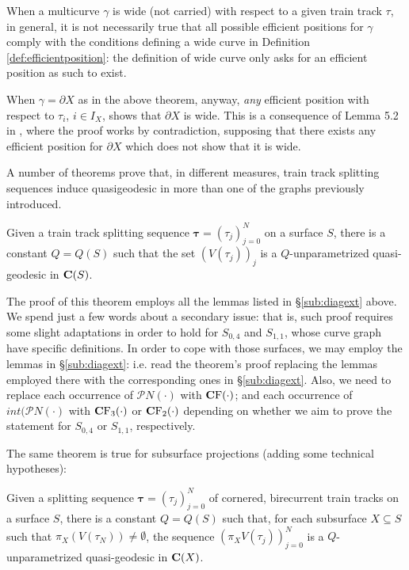 \begin{rmk}
When a multicurve $\gamma$ is wide (not carried) with respect to a given train track $\tau$, in general, it is not necessarily true that all possible efficient positions for $\gamma$ comply with the conditions defining a wide curve in Definition \ref{def:efficientposition}: the definition of wide curve only asks for an efficient position as such to exist.

When $\gamma=\partial X$ as in the above theorem, anyway, \emph{any} efficient position with respect to $\tau_i$, $i\in I_X$, shows that $\partial X$ is wide. This is a consequence of Lemma 5.2 in \cite{mms}, where the proof works by contradiction, supposing that there exists any efficient position for $\partial X$ which does not show that it is wide.
\end{rmk}

A number of theorems prove that, in different measures, train track splitting sequences induce quasigeodesic in more than one of the graphs previously introduced.

\begin{theo}\label{thm:mm_cc_geodicity}
Given a train track splitting sequence $\bm\tau=(\tau_j)_{j=0}^N$ on a surface $S$, there is a constant $Q=Q(S)$ such that the set $\left(V(\tau_j)\right)_j$ is a $Q$-unparametrized quasi-geodesic in $\mathbf C(S)$.
\end{theo}
The proof of this theorem employs all the lemmas listed in \S \ref{sub:diagext} above. We spend just a few words about a secondary issue: that is, such proof requires some slight adaptations in order to hold for $S_{0,4}$ and $S_{1,1}$, whose curve graph have specific definitions. In order to cope with those surfaces, we may employ the lemmas in \S \ref{sub:diagext}: i.e. read the theorem's proof replacing the lemmas employed there with the corresponding ones in \S\ref{sub:diagext}. Also, we need to replace each occurrence of  $\mathcal PN(\cdot)$ with $\mathbf C \mathrm F(\cdot)$; and each occurrence of $int(\mathcal PN(\cdot)$ with $\mathbf C \mathrm F_3(\cdot)$ or $\mathbf C \mathrm F_2(\cdot)$ depending on whether we aim to prove the statement for $S_{0,4}$ or $S_{1,1}$, respectively.

The same theorem is true for subsurface projections (adding some technical hypotheses):
\begin{theo}\label{thm:mms_cc_geodicity}
Given a splitting sequence $\bm\tau=(\tau_j)_{j=0}^N$ of cornered, birecurrent train tracks on a surface $S$, there is a constant $Q=Q(S)$ such that, for each subsurface $X\subseteq S$ such that $\pi_X(V(\tau_N))\not=\emptyset$, the sequence $\left(\pi_XV(\tau_j)\right)_{j=0}^N$ is a $Q$-unparametrized quasi-geodesic in $\mathbf C(X)$.
\end{theo}

